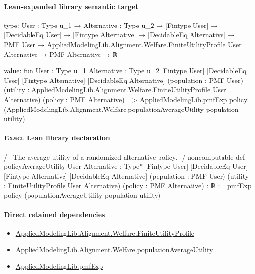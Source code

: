 \documentclass[10pt]{article}
\begin{document}
\paragraph{Lean-expanded library semantic target}
\begin{ReviewVerbatim}
type:
{User : Type u_1} →
  {Alternative : Type u_2} →
    [Fintype User] →
      [DecidableEq User] →
        [Fintype Alternative] →
          [DecidableEq Alternative] →
            PMF User → AppliedModelingLib.Alignment.Welfare.FiniteUtilityProfile User Alternative → PMF Alternative → ℝ

value:
fun {User : Type u_1} {Alternative : Type u_2} [Fintype User] [DecidableEq User] [Fintype Alternative]
    [DecidableEq Alternative] (population : PMF User)
    (utility : AppliedModelingLib.Alignment.Welfare.FiniteUtilityProfile User Alternative) (policy : PMF Alternative) =>
  AppliedModelingLib.pmfExp policy (AppliedModelingLib.Alignment.Welfare.populationAverageUtility population utility)
\end{ReviewVerbatim}

\paragraph{Exact Lean library declaration}
\begin{ReviewVerbatim}
/-- The average utility of a randomized alternative policy. -/
noncomputable def policyAverageUtility
    {User Alternative : Type*} [Fintype User] [DecidableEq User]
    [Fintype Alternative] [DecidableEq Alternative]
    (population : PMF User) (utility : FiniteUtilityProfile User Alternative)
    (policy : PMF Alternative) : ℝ :=
  pmfExp policy (populationAverageUtility population utility)
\end{ReviewVerbatim}

\paragraph{Direct retained dependencies}
\begin{itemize}\raggedright
\item \hyperlink{library-prerequisite-56c0734f8877ddbe}{Applied\allowbreak{}Modeling\allowbreak{}Lib.\allowbreak{}Alignment.\allowbreak{}Welfare.\allowbreak{}Finite\allowbreak{}Utility\allowbreak{}Profile}
\item \hyperlink{library-prerequisite-15f4b442749deab2}{Applied\allowbreak{}Modeling\allowbreak{}Lib.\allowbreak{}Alignment.\allowbreak{}Welfare.\allowbreak{}population\allowbreak{}Average\allowbreak{}Utility}
\item \hyperlink{governing-declaration-8e4b4389a4f6454b}{Applied\allowbreak{}Modeling\allowbreak{}Lib.\allowbreak{}pmf\allowbreak{}Exp}
\end{itemize}
\end{document}

